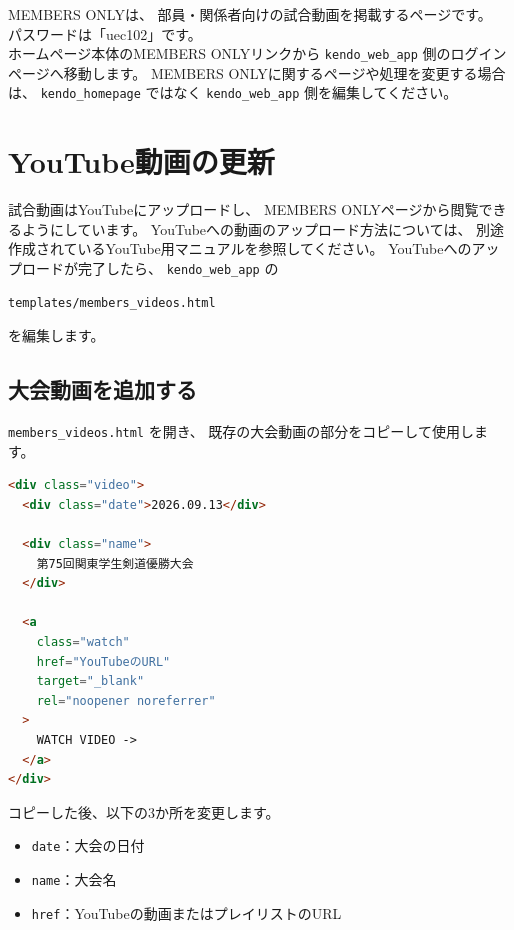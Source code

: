 \documentclass[a4paper,11pt]{ltjsarticle}
\begin{document}
MEMBERS ONLYは、
部員・関係者向けの試合動画を掲載するページです。\\
パスワードは「uec102」です。\\
ホームページ本体のMEMBERS ONLYリンクから
\texttt{kendo\_web\_app} 側のログインページへ移動します。
MEMBERS ONLYに関するページや処理を変更する場合は、
\texttt{kendo\_homepage} ではなく
\texttt{kendo\_web\_app} 側を編集してください。


\section{YouTube動画の更新}

試合動画はYouTubeにアップロードし、
MEMBERS ONLYページから閲覧できるようにしています。
YouTubeへの動画のアップロード方法については、
別途作成されているYouTube用マニュアルを参照してください。
YouTubeへのアップロードが完了したら、
\texttt{kendo\_web\_app} の

\begin{lstlisting}
templates/members_videos.html
\end{lstlisting}
を編集します。


\subsection{大会動画を追加する}

\texttt{members\_videos.html} を開き、
既存の大会動画の部分をコピーして使用します。

\begin{lstlisting}[language=HTML]
<div class="video">
  <div class="date">2026.09.13</div>

  <div class="name">
    第75回関東学生剣道優勝大会
  </div>

  <a
    class="watch"
    href="YouTubeのURL"
    target="_blank"
    rel="noopener noreferrer"
  >
    WATCH VIDEO ->
  </a>
</div>
\end{lstlisting}

コピーした後、以下の3か所を変更します。

\begin{itemize}
  \item \texttt{date}：大会の日付
  \item \texttt{name}：大会名
  \item \texttt{href}：YouTubeの動画またはプレイリストのURL
\end{itemize}
\end{document}
